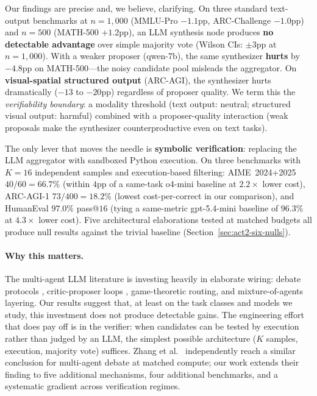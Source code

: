 \documentclass[11pt]{amsart}
\newcommand\1{{\mathds{1}}}
\theoremstyle{definition}
\theoremstyle{remark}
\numberwithin{equation}{section}
\begin{document}
Our findings are precise and, we believe, clarifying.
On three standard text-output benchmarks at $n\!=\!1{,}000$ (MMLU-Pro $-1.1$pp, ARC-Challenge $-1.0$pp) and $n\!=\!500$ (MATH-500 $+1.2$pp), an LLM synthesis node produces \textbf{no detectable advantage} over simple majority vote (Wilson CIs: $\pm 3$pp at $n\!=\!1{,}000$).
With a weaker proposer (qwen-7b), the same synthesizer \textbf{hurts} by $-4.8$pp on MATH-500---the noisy candidate pool misleads the aggregator.
On \textbf{visual-spatial structured output} (ARC-AGI), the synthesizer hurts dramatically ($-13$ to $-20$pp) regardless of proposer quality.
We term this the \emph{verifiability boundary}: a modality threshold (text output: neutral; structured visual output: harmful) combined with a proposer-quality interaction (weak proposals make the synthesizer counterproductive even on text tasks).

The only lever that moves the needle is \textbf{symbolic verification}: replacing the LLM aggregator with sandboxed Python execution.
On three benchmarks with $K\!=\!16$ independent samples and execution-based filtering: AIME~2024+2025 $40/60 = 66.7\%$ (within $4$pp of a same-task o4-mini baseline at $2.2\times$ lower cost), ARC-AGI-1 $73/400 = 18.2\%$ (lowest cost-per-correct in our comparison), and HumanEval $97.0\%$ pass@$16$ (tying a same-metric gpt-5.4-mini baseline of $96.3\%$ at $4.3\times$ lower cost).
Five architectural elaborations tested at matched budgets all produce null results against the trivial baseline (Section~\ref{sec:act2-six-nulls}).

\paragraph{Why this matters.}
The multi-agent LLM literature is investing heavily in elaborate wiring: debate protocols \cite{Du2023Debate}, critic-proposer loops \cite{Shinn2023Reflexion, Madaan2023SelfRefine}, game-theoretic routing, and mixture-of-agents layering.
Our results suggest that, at least on the task classes and models we study, this investment does not produce detectable gains.
The engineering effort that does pay off is in the verifier: when candidates can be tested by execution rather than judged by an LLM, the simplest possible architecture ($K$ samples, execution, majority vote) suffices.
Zhang et al.\ \cite{Zhang2025StopOvervaluingMAD} independently reach a similar conclusion for multi-agent debate at matched compute; our work extends their finding to five additional mechanisms, four additional benchmarks, and a systematic gradient across verification regimes.
\end{document}
